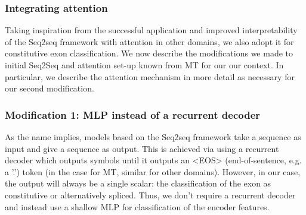 \subsubsection{Integrating attention}
Taking inspiration from the successful application and improved interpretability of the Seq2seq framework with attention in other domains, we also adopt it for constitutive exon classification. We now describe the modifications we made to initial Seq2Seq and attention set-up known from MT for our our context. In particular, we describe the attention mechanism in more detail as necessary for our second modification.
\subsubsection{Modification 1: MLP instead of a recurrent decoder}
As the name implies, models based on the Seq2seq framework take a sequence as input and give a sequence as output. This is achieved via using a recurrent decoder which outputs symbols until it outputs an <EOS> (end-of-sentence, e.g. a '.') token (in the case for MT, similar for other domains). However, in our case, the output will always be a single scalar: the classification of the exon as constitutive or alternatively spliced. Thus, we don't require a recurrent decoder and instead use a shallow MLP for classification of the encoder features.
